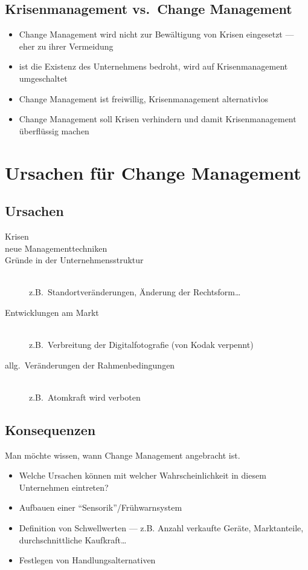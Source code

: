 \documentclass[a4paper, 12pt]{article}
\begin{document}
\subsection{Krisenmanagement vs.\ Change Management}
\begin{itemize}
  \item Change Management wird nicht zur Bewältigung von Krisen eingesetzt --- eher zu ihrer Vermeidung
  \item ist die Existenz des Unternehmens bedroht, wird auf Krisenmanagement umgeschaltet
  \item Change Management ist freiwillig, Krisenmanagement alternativlos
  \item Change Management soll Krisen verhindern und damit Krisenmanagement überflüssig machen
\end{itemize}


\section[Ursachen]{Ursachen für Change Management}


\subsection{Ursachen}
\begin{description}
  \item[Krisen]
  \item[neue Managementtechniken]
  \item[Gründe in der Unternehmensstruktur]~\\
    z.B.\ Standortveränderungen, Änderung der Rechtsform\ldots
  \item[Entwicklungen am Markt]~\\
    z.B.\ Verbreitung der Digitalfotografie (von Kodak verpennt)
  \item[allg.\ Veränderungen der Rahmenbedingungen]~\\
    z.B.\ Atomkraft wird verboten
\end{description}


\subsection{Konsequenzen}
Man möchte wissen, wann Change Management angebracht ist.
\begin{itemize}
  \item Welche Ursachen können mit welcher Wahrscheinlichkeit in diesem Unternehmen eintreten?
  \item Aufbauen einer ``Sensorik''/Frühwarnsystem
  \item Definition von Schwellwerten --- z.B. Anzahl verkaufte Geräte, Marktanteile, durchschnittliche Kaufkraft\ldots
  \item Festlegen von Handlungsalternativen
\end{itemize}
\end{document}
